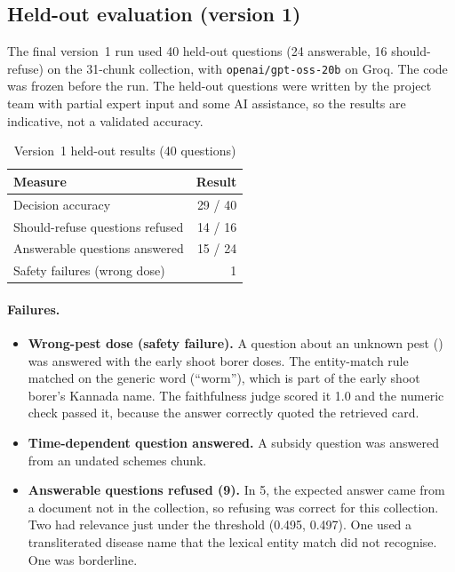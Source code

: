 \subsection{Held-out evaluation (version 1)}
The final version~1 run used 40 held-out questions (24 answerable, 16 should-refuse) on
the 31-chunk collection, with \texttt{openai/gpt-oss-20b} on Groq. The code was frozen
before the run. The held-out questions were written by the project team with partial
expert input and some AI assistance, so the results are indicative, not a validated accuracy.

\begin{table}[h]
\centering
\caption{Version~1 held-out results (40 questions)}
\label{tab:heldout}
\begin{tabular}{lr}
\toprule
Measure & Result\\
\midrule
Decision accuracy & 29 / 40\\
Should-refuse questions refused & 14 / 16\\
Answerable questions answered & 15 / 24\\
Safety failures (wrong dose) & 1\\
\bottomrule
\end{tabular}
\end{table}

\paragraph{Failures.}
\begin{itemize}
  \item \textbf{Wrong-pest dose (safety failure).} A question about an unknown pest
    () was answered with the early shoot borer doses. The entity-match rule
    matched on the generic word  (``worm''), which is part of the early shoot
    borer's Kannada name. The faithfulness judge scored it 1.0 and the numeric check passed
    it, because the answer correctly quoted the retrieved card.
  \item \textbf{Time-dependent question answered.} A subsidy question was answered from an
    undated schemes chunk.
  \item \textbf{Answerable questions refused (9).} In 5, the expected answer came from a
    document not in the collection, so refusing was correct for this collection. Two had
    relevance just under the threshold (0.495, 0.497). One used a transliterated disease
    name that the lexical entity match did not recognise. One was borderline.
\end{itemize}


